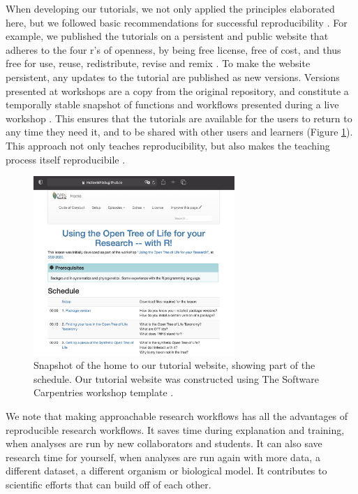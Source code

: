 \documentclass[12pt]{article}
\begin{document}
When developing our tutorials, we not only applied the principles elaborated here,
but we followed basic recommendations for successful reproducibility \citep{sandve2013ten}.
For example, we published the tutorials on a persistent and public website \citep{RopentreeTutorials} that adheres to the four r's of openness, by being free license, free of cost, and thus free for use, reuse, redistribute, revise and remix \citep{hilton2010four}. 
To make the website persistent, any updates to the tutorial are published as new versions.
Versions presented at workshops are a copy from the original repository, and constitute a temporally stable snapshot of functions and workflows presented during a live workshop \citep{wilson2006swc, SWCwebsite}.
This ensures that the tutorials are available for the users to return to any time they need it, and to be shared with other users and learners (Figure \ref{fig:schedule}).
This approach not only teaches reproducibility, but also makes the teaching process itself reproducibile \citep{dogucu_tools_2022}.

\begin{figure}
\begin{center}
\includegraphics[width=3in]{fig-schedule.png}
\end{center}
\caption{Snapshot of the home to our tutorial website, showing part of the schedule.
 Our tutorial website was constructed using The Software Carpentries workshop template \citep{swc-workshop-template}. \label{fig:schedule}}
\end{figure}

We note that making approachable research workflows has all the advantages of reproducible research workflows.
It saves time during explanation and training, when analyses are run by new collaborators and students.
It can also save research time for yourself, when analyses are run again with more data, a different dataset, a different organism or biological model.
It contributes to scientific efforts that can build off of each other.
\end{document}
